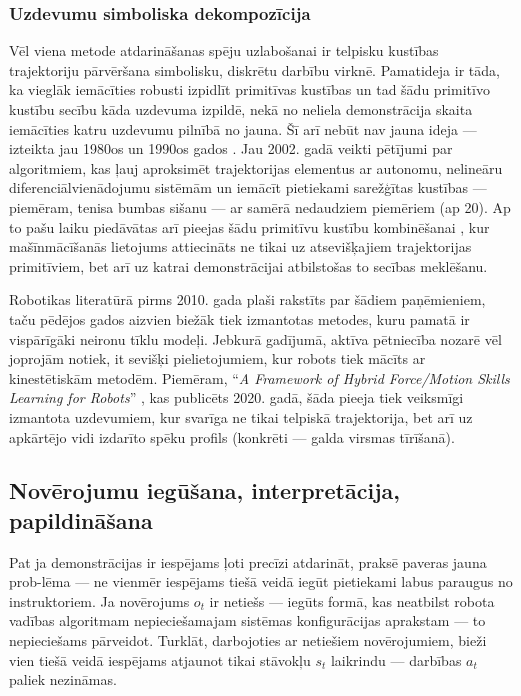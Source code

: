 \documentclass[12pt, a4paper]{article}
\numberwithin{equation}{section} %
\begin{document}
\subsubsection{Uzdevumu simboliska dekompozīcija}

Vēl viena metode atdarināšanas spēju uzlabošanai ir telpisku kustības trajektoriju pārvēršana simbolisku, diskrētu darbību virknē. Pamatideja ir tāda, ka vieglāk iemācīties robusti izpidlīt primitīvas kustības un tad šādu primitīvo kustību secību kāda uzdevuma izpildē, nekā no neliela demonstrācija skaita iemācīties katru uzdevumu pilnībā no jauna. Šī arī nebūt nav jauna ideja --- izteikta jau 1980os un 1990os gados \cite{muench1994robot}. Jau 2002. gadā veikti pētījumi par algoritmiem, kas ļauj aproksimēt trajektorijas elementus ar autonomu, nelineāru diferenciālvienādojumu sistēmām \cite{ijspeert2002movement} un iemācīt pietiekami sarežģītas kustības --- piemēram, tenisa bumbas sišanu --- ar samērā nedaudziem piemēriem (ap 20). Ap to pašu laiku piedāvātas arī pieejas šādu primitīvu kustību kombinēšanai \cite{schaal2003computational}, kur mašīnmācīšanās lietojums attiecināts ne tikai uz atsevišķajiem trajektorijas primitīviem, bet arī uz katrai demonstrācijai atbilstošas to secības meklēšanu.

Robotikas literatūrā pirms 2010. gada \cite{billard2008handbook} plaši rakstīts par šādiem paņēmieniem, taču pēdējos gados aizvien biežāk tiek izmantotas metodes, kuru pamatā ir vispārīgāki neironu tīklu modeļi. Jebkurā gadījumā, aktīva pētniecība nozarē vēl joprojām notiek, it sevišķi pielietojumiem, kur robots tiek mācīts ar kinestētiskām metodēm. Piemēram, ``\textit{A Framework of Hybrid Force/Motion Skills Learning for Robots}'' \cite{wang2020framework}, kas publicēts 2020. gadā, šāda pieeja tiek veiksmīgi izmantota uzdevumiem, kur svarīga ne tikai telpiskā trajektorija, bet arī uz apkārtējo vidi izdarīto spēku profils (konkrēti --- galda virsmas tīrīšanā).

\subsection{Novērojumu iegūšana, interpretācija, papildināšana}

Pat ja demonstrācijas ir iespējams ļoti precīzi atdarināt, praksē paveras jauna prob-lēma --- ne vienmēr iespējams tiešā veidā iegūt pietiekami labus paraugus no instruktoriem. Ja novērojums $o_t$ ir netiešs --- iegūts formā, kas neatbilst robota vadības algoritmam nepieciešamajam sistēmas konfigurācijas aprakstam --- to nepieciešams pārveidot. Turklāt, darbojoties ar netiešiem novērojumiem, bieži vien tiešā veidā iespējams atjaunot tikai stāvokļu $s_t$ laikrindu --- darbības $a_t$ paliek nezināmas.
\end{document}
